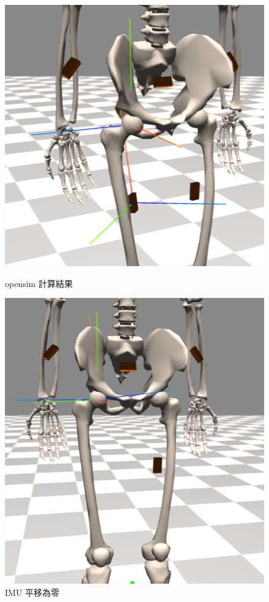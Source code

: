 \begin{figure}[!ht]
   \centering
   \begin{minipage}{.3\textwidth}
     \centering
     \includegraphics[width=.8\linewidth, height=.8\linewidth]{figure/ch3_fig_imu_ori.png}
     \caption[opensim 計算結果]{opensim 計算結果}
     \label{ch3_fig_imu_ori}
   \end{minipage}%
   \begin{minipage}{.3\textwidth}
     \centering
     \includegraphics[width=.8\linewidth, height=.8\linewidth]{figure/ch3_fig_imu_tra.png}
     \caption[IMU 平移為零]{IMU 平移為零}
     \label{ch3_fig_imu_tra}

\end{minipage}
\end{figure}

